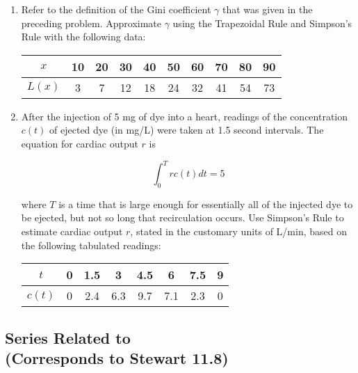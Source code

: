 \documentclass{article}
\begin{document}
\begin{enumerate}
    \item Refer to the definition of the Gini coefficient $\gamma$ that was given in the preceding problem. Approximate $\gamma$ using the Trapezoidal Rule and Simpson's Rule with the following data: \vspace{2em}
    
    \begin{tabular}{|c|c|c|c|c|c|c|c|c|c|} \hline
        $x$ & 10 & 20 & 30 & 40 & 50 & 60 & 70 & 80 & 90 \\ \hline
        $L(x)$ & 3 & 7 & 12 & 18 & 24 & 32 & 41 & 54 & 73 \\ \hline
    \end{tabular}

    \item After the injection of 5 mg of dye into a heart, readings of the concentration $c(t)$ of ejected dye (in mg/L) were taken at 1.5 second intervals. The equation for cardiac output $r$ is \vspace{2em}

    $$\int_0^Trc(t)dt=5$$ \vspace{2em}

    where $T$ is a time that is large enough for essentially all of the injected dye to be ejected, but not so long that recirculation occurs. Use Simpson's Rule to estimate cardiac output $r$, stated in the customary units of L/min, based on the following tabulated readings: \vspace{2em}

    \begin{tabular}{|c|c|c|c|c|c|c|c|} \hline
        $t$ & 0 & 1.5 & 3 & 4.5 & 6 & 7.5 & 9 \\ \hline
        $c(t)$ & 0 & 2.4 & 6.3 & 9.7 & 7.1 & 2.3 & 0 \\ \hline
    \end{tabular}
\end{enumerate} \vspace{2em}

\subsection*{Series Related to \\\textbf{(Corresponds to Stewart 11.8)}} \vspace{2em}
\end{document}
